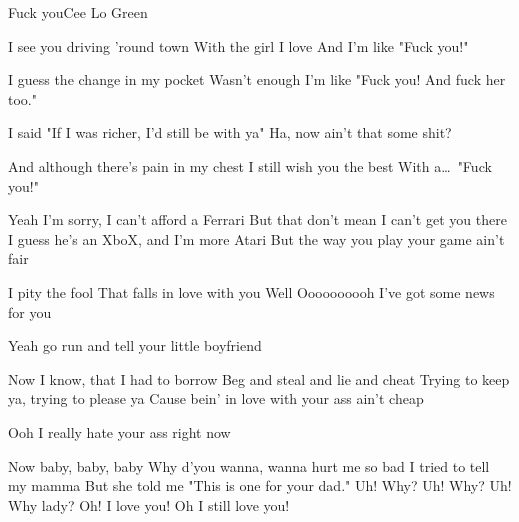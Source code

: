 \documentclass[a4paper,11pt,french]{article}
\begin{document}

\begin{Song}{Fuck you}{Cee Lo Green}
\begin{multicols}{2}

\begin{Chorus}
I see you driving 'round town
With the girl I love
And I'm like "Fuck you!"
\espaceInterStrophe

I guess the change in my pocket
Wasn't enough
I'm like "Fuck you!
And fuck her too."
\espaceInterStrophe

I said "If I was richer,
I'd still be with ya"
Ha, now ain't that some shit?
\espaceInterStrophe

And although there's pain in my chest
I still wish you the best
With a\dots\ "Fuck you!"
\end{Chorus}
\espaceInterStrophe

\begin{Verse}
Yeah I'm sorry, I can't afford a Ferrari
But that don't mean I can't get you there
I guess he's an XboX, and I'm more Atari
But the way you play your game ain't fair
\end{Verse}
\espaceInterStrophe

\begin{PreChorus}
I pity the fool
That falls in love with you
Well
Oooooooooh
I've got some news for you
\espaceInterStrophe

Yeah go run and tell your little boyfriend
\end{PreChorus}
\espaceInterStrophe

\tochorus
\espaceInterStrophe

\begin{Verse}
Now I know, that I had to borrow
Beg and steal and lie and cheat
Trying to keep ya, trying to please ya
Cause bein' in love with your ass ain't cheap
\end{Verse}
\espaceInterStrophe

\espaceInterStrophe

Ooh I really hate your ass right now
\espaceInterStrophe

\tochorus
\espaceInterStrophe

\begin{Bridge}
Now baby, baby, baby
Why d'you wanna, wanna hurt me so bad 
I tried to tell my mamma
But she told me "This is one for your dad."
Uh! Why? Uh! Why? Uh! Why lady?
Oh! I love you! Oh I still love you!
\end{Bridge}
\espaceInterStrophe


\end{multicols}
\end{Song}
\end{document}
